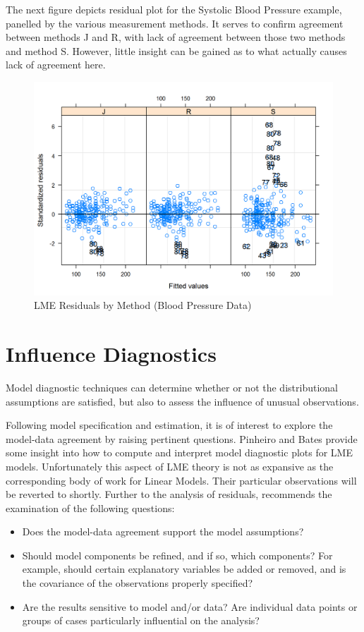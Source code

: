 \documentclass[12pt, a4paper]{report}
\theoremstyle{plain}
\theoremstyle{definition}
\theoremstyle{remark}
\begin{document}
The next figure depicts residual plot for the Systolic Blood Pressure example, panelled by the various measurement methods. It serves to confirm agreement between methods J and R, with lack of agreement between those two methods and method S. However, little insight can be gained as to what actually causes lack of agreement here. 
\begin{figure}[h!]
\centering
\includegraphics[width=0.8\linewidth]{images/bloodnlme-ResidPlot}
\caption{LME Residuals by Method (Blood Pressure Data)}

\end{figure}

\section{Influence Diagnostics}

	Model diagnostic techniques can determine whether or not the distributional assumptions are satisfied, but also to assess the influence of unusual observations. 
	
	
	Following model specification and estimation, it is of interest to explore the model-data
	agreement by raising pertinent questions. Pinheiro and Bates provide some insight into how to compute and interpret model diagnostic plots for LME models. Unfortunately this aspect of LME theory is not as expansive as the corresponding body of work for Linear Models. Their particular observations will be reverted to shortly. Further to the analysis of residuals, \citet{schabenberger} recommends the examination of the following questions:
	\begin{itemize}
		\item Does the model-data agreement support the model assumptions?
		\item Should model components be refined, and if so, which components? For example, should certain explanatory variables
		be added or removed, and is the covariance of the observations properly specified?
		\item Are the results sensitive to model and/or data? Are individual data points or groups of cases particularly
		influential on the analysis?
	\end{itemize}
	
\end{document}
